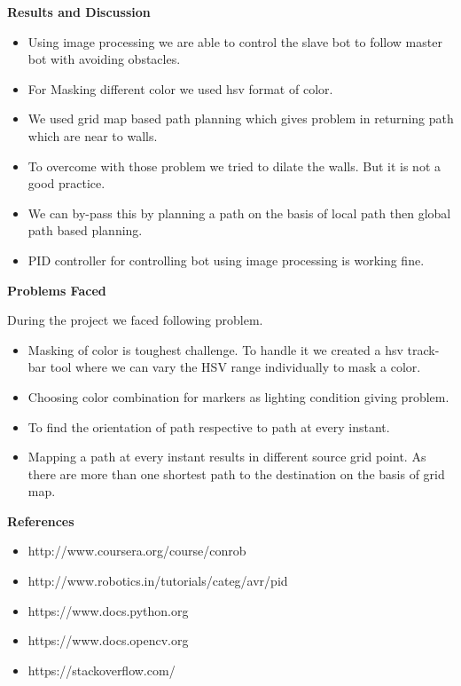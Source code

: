\documentclass[report]{res}
\begin{document}
	\pagebreak
	
	
	\begin{center}
		\textbf{\huge Results and Discussion} \\
	\end{center}
	
	\begin{itemize}
		\item Using image processing we are able to control the slave bot to follow master bot with avoiding obstacles.
		\item For Masking different color we used hsv format of color. 
		\item We used grid map based path planning which gives problem in returning path which are near to walls. 
		\item To overcome with those problem we tried to dilate the walls. But it is not a good practice. 
		\item We can by-pass this by planning a path on the basis of local path then global path based planning. 
		\item PID controller for controlling bot using image processing is working fine. 
	\end{itemize}
	
	\pagebreak
	
	
	\begin{center}
		\textbf{\huge Problems Faced} \\
	\end{center}
	
	During the project we faced following problem.
	
	\begin{itemize}
		
		\item Masking of color is toughest challenge. To handle it we created a hsv track-bar tool where we can vary the HSV range individually to mask a color.
		\item Choosing color combination for markers as lighting condition giving problem.
		\item To find the orientation of path respective to path at every  instant.
		\item Mapping a path at every instant results in different source grid point. As there are more than one shortest path to the destination on the basis of grid map. 
		
	\end{itemize}
	
	\pagebreak
	
	
	\begin{center}
		\textbf{\huge References} \\
	\end{center}
	
	\begin{itemize}
		
		\item http://www.coursera.org/course/conrob
		\item http://www.robotics.in/tutorials/categ/avr/pid
		\item https://www.docs.python.org
		\item https://www.docs.opencv.org
		\item https://stackoverflow.com/
		
	\end{itemize}
	
\end{document}
